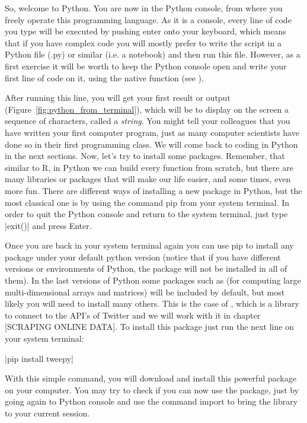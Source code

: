 So, welcome to Python. You are now in the Python console, from where
you freely operate this programming language. As it is a console,
every line of code you type will be executed by pushing enter onto
your keyboard, which means that if you have complex code you will
mostly prefer to write the script in a Python file (.py) or similar
(i.e. a notebook) and then run this file. However, as a first exercise
it will be worth to keep the Python console open and write your first
line of code on it, using the native function  (see ).


After running this line, you will get your first result or
output (Figure~\ref{fig:python_from_terminal}), which will be to
display on the screen a sequence of characters, called a
\emph{string}. You might tell your colleagues that you have written
your first computer program, just as many computer scientists have
done so in their first programming class. We will come back to coding
in Python in the next sections. Now, let’s try to install some
packages. Remember, that similar to R, in Python we can build every
function from scratch, but there are many libraries or packages that
will make our life easier, and some times, even more fun. There are
different ways of installing a new package in Python, but the most
classical one is by using the command pip from your system
terminal. In order to quit the Python console and return to the system
terminal, just type |exit()| and press Enter.

Once you are back in your system terminal again you can use pip to
install any package under your default python version (notice that if
you have different versions or environments of Python, the package
will not be installed in all of them).  In the last versions of Python
some packages such as  (for computing large
multi-dimensional arrays and matrices) will be included by default,
but most likely you will need to install many others.  This is the
case of , which is a library to connect to the API's of
Twitter and we will work with it in chapter [SCRAPING ONLINE DATA]. To
install this package just run the next line on your system terminal:

|pip install tweepy|

With this simple command, you will download and install this powerful
package on your computer. You may try to check if you can now use the
package, just by going again to Python console and use the command
import to bring the library to your current session.

